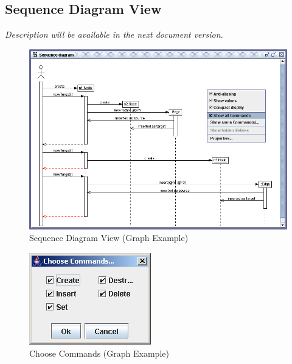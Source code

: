\documentclass[a4paper,titlepage,oneside,final]{scrreprt} %
\begin{document}
\subsection{Sequence Diagram View}\label{sequencediagramview}
\emph{Description will be available in the next document version.}
\clearpage
\begin{figure}[ht]
\centering
\includegraphics[scale=0.5]{Screenshots/GUI/Views/SequenceDiagramView.png}
\caption{Sequence Diagram View (Graph Example)}
\label{fig:SequenceDiagramView}
\end{figure}
\begin{figure}[ht]
\centering
\includegraphics[scale=0.7]{Screenshots/GUI/Views/SeqDiagChooseCommands.png}
\caption{Choose Commands (Graph Example)}
\label{fig:SeqDiagChooseCommands}
\end{figure}
\end{document}
